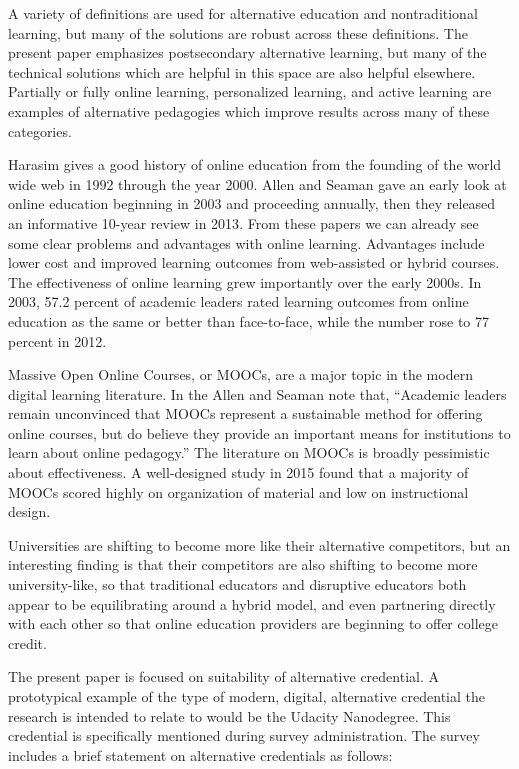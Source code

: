 \documentclass[AER]{/Users/zyl357/Documents/GitHub/research-dissertation-case-for-alt-ed/papers/alt-ed-survey/aea-latex-templates/AEA}
\begin{document}
A variety of definitions are used for alternative education and
nontraditional learning, but many of the solutions are robust across these
definitions. The present paper emphasizes postsecondary alternative
learning, but many of the technical solutions which are helpful in this
space are also helpful elsewhere. Partially or fully online learning,
personalized learning, and active learning are examples of alternative
pedagogies which improve results across many of these categories.

Harasim gives a good history of online education from the founding of the
world wide web in 1992 through the year 2000\cite{harasim2000shift}. Allen and Seaman gave an
early look at online education beginning in 2003 and proceeding annually,
then they released an informative 10-year review in 2013\cite{allen2013changing}. From these
papers we can already see some clear problems and advantages with online
learning. Advantages include lower cost and improved learning outcomes
from web-assisted or hybrid courses. The effectiveness of online learning
grew importantly over the early 2000s. In 2003, 57.2 percent of academic
leaders rated learning outcomes from online education as the same or
better than face-to-face, while the number rose to 77 percent in 2012.

Massive Open Online Courses, or MOOCs, are a major topic in the modern
digital learning literature. In the Allen and Seaman note that, “Academic
leaders remain unconvinced that MOOCs represent a sustainable method for
offering online courses, but do believe they provide an important means
for institutions to learn about online pedagogy.” The literature on MOOCs
is broadly pessimistic about effectiveness. A well-designed study in 2015
found that a majority of MOOCs scored highly on organization of material
and low on instructional design\cite{margaryan2015instructional}.

Universities are shifting to become more like their alternative
competitors, but an interesting finding is that their competitors are also
shifting to become more university-like, so that traditional educators and
disruptive educators both appear to be equilibrating around a hybrid
model, and even partnering directly with each other so that online
education providers are beginning to offer college credit.

The present paper is focused on suitability of alternative credential. A
prototypical example of the type of modern, digital, alternative
credential the research is intended to relate to would be the Udacity
Nanodegree. This credential is specifically mentioned during survey
administration. The survey includes a brief statement on alternative
credentials as follows:
\end{document}
